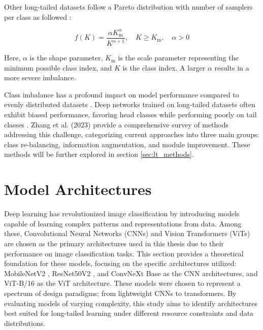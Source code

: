Other long-tailed datasets follow a Pareto distribution with number of samplers per class as followed \cite{liu2019largescalelongtailedrecognitionopen}:

\begin{equation}
    \label{eq:pareto}
    f(K) = \frac{\alpha K_{\text{m}}^\alpha}{K^{\alpha + 1}}, \quad K \geq K_{\text{m}}, \quad \alpha > 0
\end{equation}

\noindent Here, $\alpha$ is the shape parameter, $K_{\text{m}}$ is the scale parameter representing the minimum possible class index, and $K$ is the class index. A larger $\alpha$ results in a more severe imbalance.



Class imbalance has a profound impact on model performance compared to evenly distributed datasets \cite{vanhorn2017deviltailsfinegrainedclassification, cui2019classbalancedlossbasedeffective}. Deep networks trained on long-tailed datasets often exhibit biased performance, favoring head classes while performing poorly on tail classes \cite{zhang2023deep}. Zhang et al. (2023) provide a comprehensive survey of methods addressing this challenge, categorizing current approaches into three main groups: class re-balancing, information augmentation, and module improvement. These methods will be further explored in section \ref{sec:lt_methods}. 





\section{Model Architectures}
\label{sec:model_arch}
Deep learning has revolutionized image classification by introducing models capable of learning complex patterns and representations from data. Among these, Convolutional Neural Networks (CNNs) and Vision Transformers (ViTs) are chosen as the primary architectures used in this thesis due to their performance on image classification tasks. This section provides a theoretical foundation for these models, focusing on the specific architectures utilized: MobileNetV2 \cite{sandler2018mobilenetv2}, ResNet50V2 \cite{he2015deepresiduallearningimage}, and ConvNeXt Base \cite{todi2023convnext} as the CNN architectures, and ViT-B/16 \cite{dosovitskiy2021imageworth16x16words} as the ViT architecture.
These models were chosen to represent a spectrum of design paradigms; from lightweight CNNs to transformers. By evaluating models of varying complexity, this study aims to identify architectures best suited for long-tailed learning under different resource constraints and data distributions.

